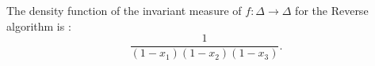 
The density function of the invariant measure of $f:\Delta\to\Delta$ for
the Reverse algorithm is \cite{arnoux_symmetric_2015}:
\[
\frac{1}{(1-x_1)(1-x_2)(1-x_3)}.
\]
